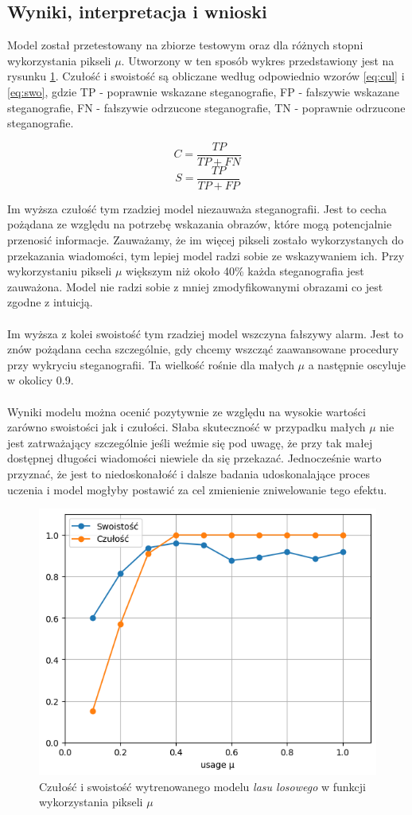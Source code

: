     \subsection{Wyniki, interpretacja i wnioski}
    Model został przetestowany na zbiorze testowym oraz dla różnych stopni wykorzystania pikseli $\mu$. Utworzony w ten sposób wykres przedstawiony jest na rysunku \ref{fig:metrics}. Czułość i swoistość są obliczane według odpowiednio wzorów \ref{eq:cul} i \ref{eq:swo}, gdzie TP - poprawnie wskazane steganografie, FP - fałszywie wskazane steganografie, FN - fałszywie odrzucone steganografie, TN - poprawnie odrzucone steganografie.

    \begin{equation}
        C = \frac{TP}{TP+FN}
        \label{eq:cul}
    \end{equation}
    \begin{equation}
    S = \frac{TP}{TP+FP}
        \label{eq:swo}
    \end{equation}

    Im wyższa czułość tym rzadziej model niezauważa steganografii. Jest to cecha pożądana ze względu na potrzebę wskazania obrazów, które mogą potencjalnie przenosić informacje. Zauważamy, że im więcej pikseli zostało wykorzystanych do przekazania wiadomości, tym lepiej model radzi sobie ze wskazywaniem ich. Przy wykorzystaniu pikseli $\mu$ większym niż około 40\% każda steganografia jest zauważona. Model nie radzi sobie z mniej zmodyfikowanymi obrazami co jest zgodne z intuicją. \\
    \\
    Im wyższa z kolei swoistość tym rzadziej model wszczyna fałszywy alarm. Jest to znów pożądana cecha szczególnie, gdy chcemy wszcząć zaawansowane procedury przy wykryciu steganografii. Ta wielkość rośnie dla małych $\mu$ a następnie oscyluje w okolicy 0.9. \\
    \\
    Wyniki modelu można ocenić pozytywnie ze względu na wysokie wartości zarówno swoistości jak i czułości. Słaba skuteczność w przypadku małych $\mu$ nie jest zatrważający szczególnie jeśli weźmie się pod uwagę, że przy tak małej dostępnej długości wiadomości niewiele da się przekazać. Jednocześnie warto przyznać, że jest to niedoskonałość i dalsze badania udoskonalające proces uczenia i model mogłyby postawić za cel zmienienie zniwelowanie tego efektu.
    
    \begin{figure}[H]
        \centering
        \includegraphics[width=0.5\linewidth]{img/metrics.png}
        \caption{Czułość i swoistość wytrenowanego modelu \textit{lasu losowego} w funkcji wykorzystania pikseli $\mu$}
        \label{fig:metrics}
    \end{figure}
